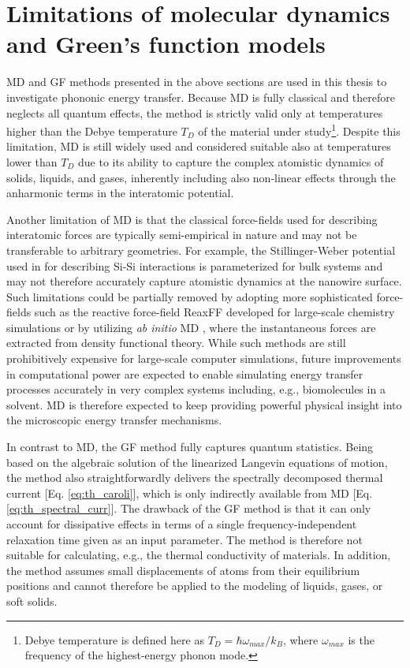 \section{Limitations of molecular dynamics and Green's function models}
\label{sec:th_limits}
MD and GF methods presented in the above sections are used in this thesis to investigate phononic energy transfer. Because MD is fully classical and therefore neglects all quantum effects, the method is strictly valid only at temperatures higher than the Debye temperature $T_D$ of the material under study\footnote{Debye temperature is defined here as $T_D=\hbar \omega_{max}/k_B$, where $\omega_{max}$ is the frequency of the highest-energy phonon mode.}. Despite this limitation, MD is still widely used and considered suitable \cite{cahill14} also at temperatures lower than $T_D$ due to its ability to capture the complex atomistic dynamics of solids, liquids, and gases, inherently including also non-linear effects through the anharmonic terms in the interatomic potential. 

Another limitation of MD is that the classical force-fields used for describing interatomic forces are typically semi-empirical in nature and may not be transferable to arbitrary geometries. For example, the Stillinger-Weber potential \cite{stillinger85} used in  for describing Si-Si interactions is parameterized for bulk systems and may not therefore accurately capture atomistic dynamics at the nanowire surface. Such limitations could be partially removed by adopting more sophisticated force-fields such as the reactive force-field ReaxFF \cite{vanduin03} developed for large-scale chemistry simulations \cite{vanduin01} or by utilizing \textit{ab initio} MD \cite{car85}\cite{barnett93}, where the instantaneous forces are extracted from density functional theory. While such methods are still prohibitively expensive for large-scale computer simulations, future improvements in computational power are expected to enable simulating energy transfer processes accurately in very complex systems including, e.g., biomolecules in a solvent. MD is therefore expected to keep providing powerful physical insight into the microscopic energy transfer mechanisms.

In contrast to MD, the GF method fully captures quantum statistics. Being based on the algebraic solution of the linearized Langevin equations of motion, the method also straightforwardly delivers the spectrally decomposed thermal current [Eq. \eqref{eq:th_caroli}], which is only indirectly available from MD [Eq. \eqref{eq:th_spectral_curr}]. The drawback of the GF method is that it can only account for dissipative effects in terms of a single frequency-independent relaxation time given as an input parameter. The method is therefore not suitable for calculating, e.g., the thermal conductivity of materials. In addition, the method assumes small displacements of atoms from their equilibrium positions and cannot therefore be applied to the modeling of liquids, gases, or soft solids.

